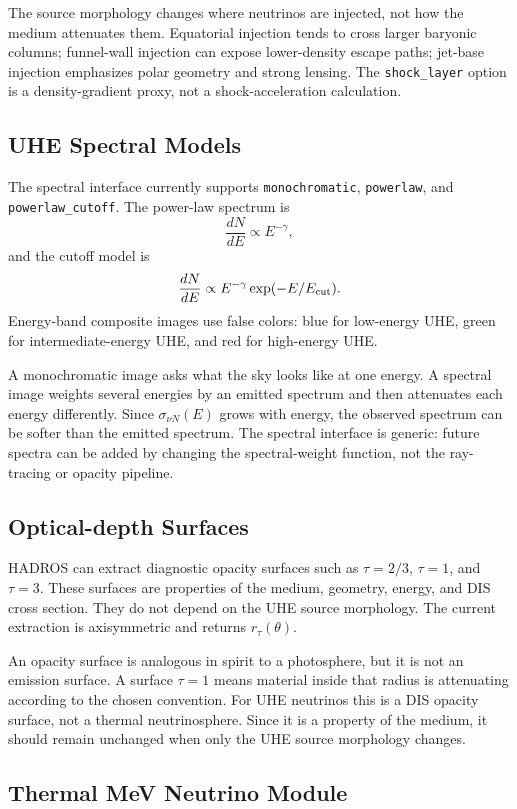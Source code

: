 \documentclass[11pt,a4paper]{article}
\begin{document}
The source morphology changes where neutrinos are injected, not how the medium
attenuates them. Equatorial injection tends to cross larger baryonic columns;
funnel-wall injection can expose lower-density escape paths; jet-base injection
emphasizes polar geometry and strong lensing. The \texttt{shock\_layer} option
is a density-gradient proxy, not a shock-acceleration calculation.

\subsection{UHE Spectral Models}

The spectral interface currently supports \texttt{monochromatic},
\texttt{powerlaw}, and \texttt{powerlaw\_cutoff}. The power-law spectrum is
\[
\frac{dN}{dE}\propto E^{-\gamma},
\]
and the cutoff model is
\[
\frac{dN}{dE}\propto E^{-\gamma}\exp(-E/E_{\rm cut}).
\]
Energy-band composite images use false colors: blue for low-energy UHE,
green for intermediate-energy UHE, and red for high-energy UHE.

A monochromatic image asks what the sky looks like at one energy. A spectral
image weights several energies by an emitted spectrum and then attenuates each
energy differently. Since $\sigma_{\nu N}(E)$ grows with energy, the observed
spectrum can be softer than the emitted spectrum. The spectral interface is
generic: future spectra can be added by changing the spectral-weight function,
not the ray-tracing or opacity pipeline.

\subsection{Optical-depth Surfaces}

HADROS can extract diagnostic opacity surfaces such as $\tau=2/3$, $\tau=1$,
and $\tau=3$. These surfaces are properties of the medium, geometry, energy,
and DIS cross section. They do not depend on the UHE source morphology. The
current extraction is axisymmetric and returns $r_\tau(\theta)$.

An opacity surface is analogous in spirit to a photosphere, but it is not an
emission surface. A surface $\tau=1$ means material inside that radius is
attenuating according to the chosen convention. For UHE neutrinos this is a DIS
opacity surface, not a thermal neutrinosphere. Since it is a property of the
medium, it should remain unchanged when only the UHE source morphology changes.

\subsection{Thermal MeV Neutrino Module}
\end{document}
